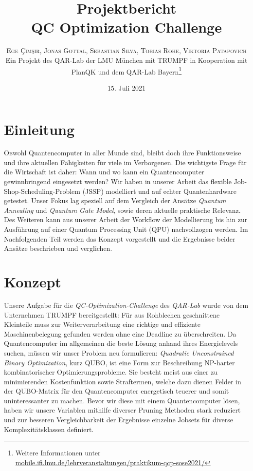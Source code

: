 \documentclass[twoside,twocolumn]{article}
\title{Projektbericht \\QC Optimization Challenge} %
\author{%
\textsc{Ege Çimşir, Jonas Gottal, Sebastian Silva, Tobias Rohe, Viktoria Patapovich}\\[1ex] %
\normalsize Ein Projekt des QAR-Lab der LMU München mit TRUMPF in Kooperation mit \\\normalsize PlanQK und dem QAR-Lab Bayern\thanks{Weitere Informationen unter \url{mobile.ifi.lmu.de/lehrveranstaltungen/praktikum-qcp-sose2021/}} %
}
\date{15. Juli 2021} %
\begin{document}
\maketitle


\section{Einleitung}

\lettrine[nindent=0em,lines=3]{O}bwohl Quantencomputer in aller Munde sind, bleibt doch ihre Funktionsweise und ihre aktuellen Fähigkeiten für viele im Verborgenen. Die wichtigste Frage für die Wirtschaft ist daher: Wann und wo kann ein Quantencomputer gewinnbringend eingesetzt werden? Wir haben in unserer Arbeit das flexible Job-Shop-Scheduling-Problem (JSSP) modelliert und auf echter Quantenhardware getestet. Unser Fokus lag speziell auf dem Vergleich der Ansätze \textit{Quantum Annealing} und \textit{Quantum Gate Model}, sowie deren aktuelle praktische Relevanz. Des Weiteren kann aus unserer Arbeit der Workflow der Modellierung bis hin zur Ausführung auf einer Quantum Processing Unit (QPU) nachvollzogen werden. Im Nachfolgenden Teil werden das Konzept vorgestellt und die Ergebnisse beider Ansätze beschrieben und verglichen.



\section{Konzept}
Unsere Aufgabe für die \textit{QC-Optimization-Challenge} des \textit{QAR-Lab} wurde von dem Unternehmen TRUMPF bereitgestellt: Für aus Rohblechen geschnittene Kleinteile muss zur Weiterverarbeitung eine richtige und effiziente Maschinenbelegung gefunden werden ohne eine Deadline zu überschreiten. Da Quantencomputer im allgemeinen die beste Lösung anhand ihres Energielevels suchen, müssen wir unser Problem neu formulieren: \textit{Quadratic Unconstrained Binary Optimization}, kurz QUBO, ist eine Form zur Beschreibung NP-harter kombinatorischer Optimierungsprobleme. Sie besteht meist aus einer zu minimierenden Kostenfunktion sowie Straftermen, welche dazu dienen Felder in der QUBO-Matrix für den Quantencomputer energetisch teuerer und somit uninteressanter zu machen. Bevor wir diese mit einem Quantencomputer lösen, haben wir unsere Variablen mithilfe diverser Pruning Methoden stark reduziert und zur besseren Vergleichbarkeit der Ergebnisse einzelne Jobsets für diverse Komplexitätsklassen definiert.
\end{document}
